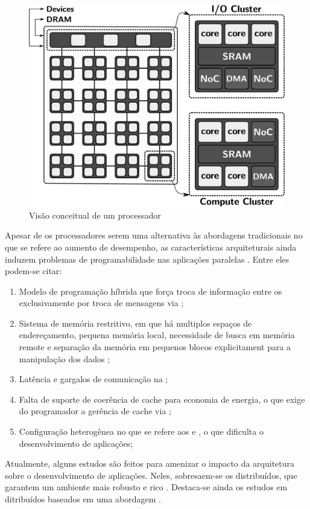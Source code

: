 \begin{figure}[bt]
	\label{fig.lw-overview}
	\centering
	\includegraphics[width=0.5\linewidth]{content/images/lw-overview-gs.jpg}
	\caption{Visão conceitual de um processador \lw \cite{penna2021inter}}
\end{figure}


Apesar de os processadores \lws serem uma alternativa às abordagens tradicionais no que se refere ao aumento de desempenho, as características arquiteturais ainda induzem problemas de programabilidade nas aplicações paralelas \cite{Castro-PARCO:2016}. Entre eles podem-se citar:

\begin{enumerate}[label= (\roman*)]
    \item Modelo de programação híbrida que força troca de informação entre os \clusters exclusivamente por troca de mensagens via \noc \cite{kelly2013};
    \item Sistema de memória restritivo, em que há multiplos espaços de endereçamento, pequena memória local, necessidade de busca em memória remote e separação da memória em pequenos blocos explicitament para a manipulação dos dados \cite{Castro-PARCO:2016};
    \item Latência e gargalos de comunicação na \noc;
    \item Falta de suporte de coerência de cache para economia de energia, o que exige do programador a gerência de cache via \software;
    \item Configuração heterogênea no que se refere aos \cclusters e \ioclusters, o que dificulta o desenvolvimento de aplicações;
\end{enumerate}

Atualmente, alguns estudos são feitos para amenizar o impacto da arquitetura sobre o desenvolvimento de aplicações. Neles, sobresaem-se os \oss distribuídos, que garantem um ambiente mais robusto e rico \cite{asmussen_m3:_2016, kluge_operating_2014, penna:sbesc19}. Destaca-se ainda os estudos em \oss ditribuídos baseados em uma abordagem \multikernel \cite{penna2017-1,penna2017-2,penna2019}.

